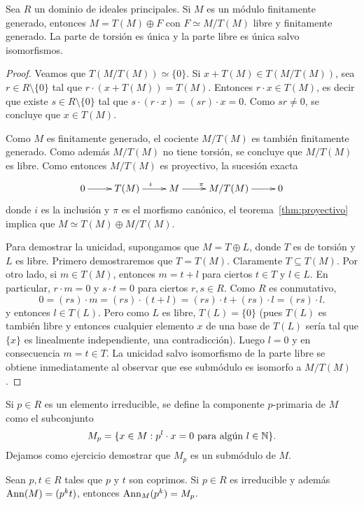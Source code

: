 \begin{theorem}
Sea $R$ un dominio de ideales principales. 
Si $M$ es un módulo finitamente generado, entonces $M=T(M)\oplus F$ con $F\simeq M/T(M)$ libre y finitamente generado. La
parte de torsión es única y la parte libre es única salvo isomorfismos.
\end{theorem}

\begin{proof}
	Veamos que $T(M/T(M))\simeq\{0\}$. Si $x+T(M)\in T(M/T(M))$, sea $r\in R\setminus\{0\}$ tal que
	$r\cdot (x+T(M))=T(M)$. Entonces $r\cdot x\in T(M)$, es decir que existe $s\in R\setminus\{0\}$ tal que $s\cdot (r\cdot x)=(sr)\cdot x=0$. 
	Como $sr\ne 0$, se concluye que $x\in T(M)$. 
	
	Como $M$ es finitamente generado, el cociente $M/T(M)$ es también finitamente generado. Como además $M/T(M)$ no tiene torsión, 
	se concluye que $M/T(M)$ es libre. 
	Como entonces $M/T(M)$ es proyectivo, la sucesión exacta 
	\[
	\xymatrix{
	 0\ar[r] 
	 & T(M)
	 \ar[r]^i
	 & M
	 \ar[r]^{\pi}
	 & M/T(M)
	 \ar[r]
	 & 0
	 }
	 \]
	 donde $i$ es la inclusión y $\pi$ es el morfismo canónico, 	el teorema~\ref{thm:proyectivo} 
	 implica que $M\simeq T(M)\oplus M/T(M)$. 	
	 
	 Para demostrar la unicidad, supongamos que $M=T\oplus L$, donde $T$ es de torsión y $L$ es libre. Primero
	 demostraremos que $T=T(M)$. Claramente 
	 $T\subseteq T(M)$. Por otro lado, si $m\in T(M)$, entonces $m=t+l$ para ciertos $t\in T$ y $l\in L$. En particular, 
	 $r\cdot m=0$ y $s\cdot t=0$ para ciertos $r,s\in R$. Como $R$ es conmutativo, 
	 \[
	 0=(rs)\cdot m=(rs)\cdot (t+l)=(rs)\cdot t+(rs)\cdot l=(rs)\cdot l.
	 \]
	 y entonces $l\in T(L)$. Pero 
	 como $L$ es libre, $T(L)=\{0\}$ (pues $T(L)$ es también libre y entonces cualquier elemento $x$  
	 de una base de $T(L)$ sería tal que $\{x\}$ es linealmente independiente, una contradicción). Luego 
	 $l=0$ y en consecuencia $m=t\in T$. La unicidad salvo isomorfismo de la parte libre
	 se obtiene inmediatamente al observar que 
	 ese submódulo es isomorfo a $M/T(M)$. 
\end{proof}


Si $p\in R$ es un elemento irreducible, se define la componente $p$-primaria de $M$ como
el subconjunto 
\[
M_p=\{x\in M:p^l\cdot x=0\text{ para algún $l\in\mathbb{N}$}\}.
\]
Dejamos como ejercicio demostrar que $M_p$ es un submódulo de $M$. 

\begin{lemma}
	\label{lem:Mp}
	Sean $p,t\in R$ tales que $p$ y $t$ son coprimos. Si $p\in R$ es irreducible y además   
	$\operatorname{Ann}(M)=(p^kt)$, entonces $\operatorname{Ann}_M(p^k)=M_p$. 
\end{lemma}

